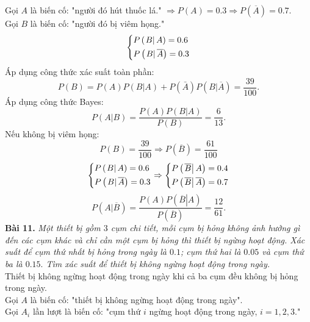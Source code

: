 \documentclass[12pt,a4paper]{article}
\begin{document}
Gọi $A$ là biến cố: "người đó hút thuốc lá." $\Rightarrow P \left( A \right) = 0.3 \Rightarrow P \left( {\overline{A}} \right) = 0.7.$\\
Gọi $B$ là biến cố: "người đó bị viêm họng."
$$\left\{ \begin{gathered}
  P\left( {\left. B \right|A} \right) = 0.6 \hfill \\
  P\left( {\left. B \right|\overline A } \right) = 0.3 \hfill \\ 
\end{gathered}  \right.$$
Áp dụng công thức xác suất toàn phần:
$$P\left( B \right) = P\left( A \right)P\left( {\left. B \right|A} \right) + P\left( {\bar A} \right)P\left( {\left. B \right|\overline A } \right) = \frac{{39}}{{100}}.$$
Áp dụng công thức Bayes:
$$P\left( {\left. A \right|B} \right) = \frac{{P\left( A \right)P\left( {\left. B \right|A} \right)}}{{P\left( B \right)}} = \frac{6}{{13}}.$$
Nếu không bị viêm họng:
$$P\left( B \right) = \frac{{39}}{{100}} \Rightarrow P\left( {\overline B } \right) = \frac{{61}}{{100}}$$
$$\left\{ \begin{gathered}
  P\left( {\left. B \right|A} \right) = 0.6 \hfill \\
  P\left( {\left. B \right|\overline A } \right) = 0.3 \hfill \\ 
\end{gathered}  \right. \Rightarrow \left\{ \begin{gathered}
  P\left( {\left. {\overline B } \right|A} \right) = 0.4 \hfill \\
  P\left( {\left. {\overline B } \right|\overline A } \right) = 0.7 \hfill \\ 
\end{gathered}  \right.$$
\[P\left( {\left. A \right|\overline B } \right) = \frac{{P\left( A \right)P\left( {\left. {\overline B } \right|A} \right)}}{{P\left( {\overline B } \right)}} = \frac{{12}}{{61}}.\]
\textbf{Bài 11.} \textit{Một thiết bị gồm $3$ cụm chi tiết, mỗi cụm bị hỏng không ảnh hưởng gì đến các cụm khác và chỉ cần một cụm bị hỏng thì thiết bị ngừng hoạt động. Xác suất để cụm thứ nhất bị hỏng trong ngày là $0.1$; cụm thứ hai là $0.05$ và cụm thứ ba là $0.15.$ Tìm xác suất để thiết bị không ngừng hoạt động trong ngày.}\\
Thiết bị không ngừng hoạt động trong ngày khi cả ba cụm đều không bị hỏng trong ngày.\\
Gọi $A$ là biến cố: "thiết bị không ngừng hoạt động trong ngày".\\
Gọi $A_i$ lần lượt là biến cố: "cụm thứ $i$ ngừng hoạt động trong ngày, $i = 1, 2 , 3.$"\\
\end{document}
